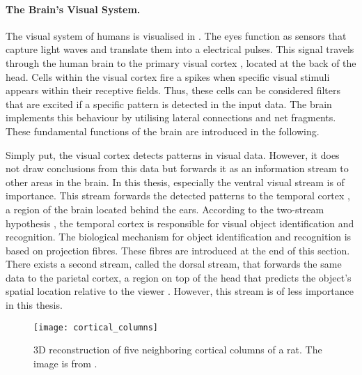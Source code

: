\paragraph{The Brain's Visual System.} The visual system of humans is visualised in . The eyes function as sensors that capture light waves and translate them into a electrical pulses. This signal travels through the human brain to the primary visual cortex , located at the back of the head.
Cells within the visual cortex fire a spikes when specific visual stimuli appears within their receptive fields. Thus, these cells can be considered filters that are excited if a specific pattern is detected in the input data. The brain implements this behaviour by utilising lateral connections and net fragments. These fundamental functions of the brain are introduced in the following.

Simply put, the visual cortex detects patterns in visual data. However, it does not draw conclusions from this data but forwards it as an information stream to other areas in the brain. In this thesis, especially the ventral visual stream is of importance. This stream forwards the detected patterns to the temporal cortex , a region of the brain located behind the ears.
According to the two-stream hypothesis , the temporal cortex is responsible for visual object identification and recognition. The biological mechanism for object identification and recognition is based on projection fibres. These fibres are introduced at the end of this section. There exists a second stream, called the dorsal stream, that forwards the same data to the parietal cortex, a region on top of the head that predicts the object's spatial location relative to the viewer . However, this stream is of less importance in this thesis.


\begin{figure}[h]
    \centering
    \texttt{[image: cortical\_columns]}
    \caption[3D reconstruction of five neighbouring cortical columns]{3D reconstruction of five neighboring cortical columns of a rat. The image is from .}
\end{figure}

